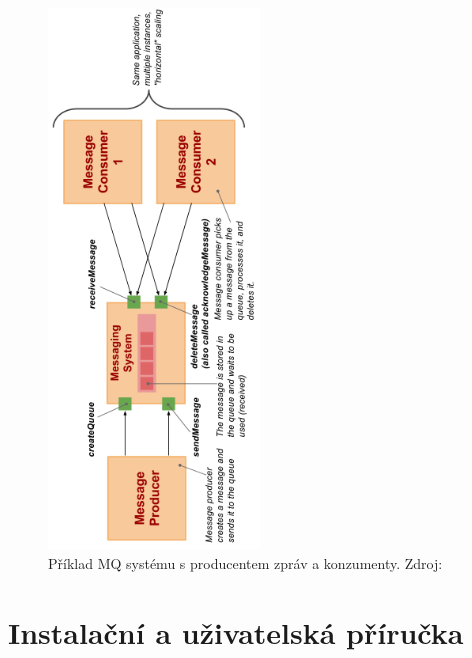 \documentclass[thesis=M,czech]{FITthesis}[2014/05/07]
\begin{document}
\begin{figure}\centering
	\includegraphics[width=0.5\textwidth]{obr/vitvar_mq.png}
 	\caption[Příklad MQ systému s producentem zpráv a konzumenty]{Příklad MQ systému s producentem zpráv a konzumenty. Zdroj: \cite{vitvarMq}}\label{fig:vitvarMq}
\end{figure}	

\chapter{Instalační a uživatelská příručka}
\end{document}
